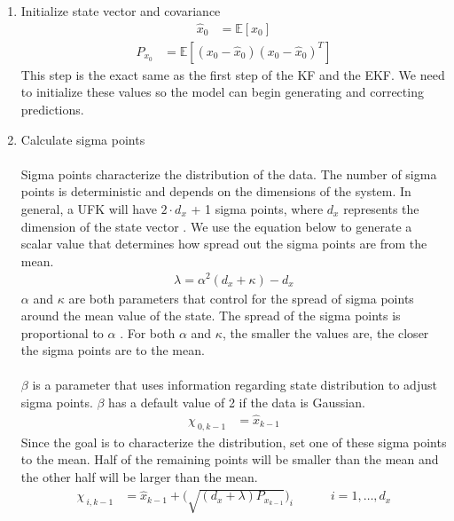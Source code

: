 \begin{enumerate}
    \item Initialize state vector and covariance
    \begin{align*}
        \hat{x}_{0} &= \mathbb{E}[x_{0}] 
       \end{align*}
        \begin{align*}
        P_{x_{0}} &= \mathbb{E}[(x_{0}-\hat{x}_{0})(x_{0}-\hat{x}_{0})^{T}] 
    \end{align*}
    This step is the exact same as the first step of the KF and the EKF. We need to initialize these values so the model can begin generating and correcting predictions.
    
        \item Calculate sigma points \\ \\
        Sigma points characterize the distribution of the data. The number of sigma points is deterministic and depends on the dimensions of the system. In general, a UFK will have  $2 \cdot d_x$ + 1 sigma points, where $d_x$ represents the dimension of the state vector \cite{inbook, inproceedings, Wan01theunscented}.  We use the equation below to generate a scalar value that determines how spread out the sigma points are from the mean. 
         \begin{align*}
        \lambda = \alpha^{2}(d_{x}+\kappa)-d_{x} 
         \end{align*}
         $\alpha$ and $\kappa$ are both parameters that control for the spread of sigma points around the mean value of the state. The spread of the sigma points is proportional to $\alpha$ . For both $\alpha$ and $\kappa $,  the smaller the values are, the closer the sigma points are to the mean.\\ \\
       $\beta$ is a parameter that uses information regarding state distribution to adjust sigma points. $\beta$ has a default value of 2 if the data is Gaussian. 
    \begin{align*}
        \chi_{\ 0,k-1} &= \hat{x}_{k-1} 
     \end{align*}
             Since the goal is to characterize the distribution, set one of these sigma points to the mean. Half of the remaining points will be smaller than the mean and the other half will be larger than the mean.
     \begin{align*}
        \chi_{\ i,k-1} &= \hat{x}_{k-1} + \bigg(\sqrt{(d_{x}+\lambda )P_{x_{k-1}}}\bigg)_{i} \quad \quad \quad i=1,\dots,d_{x} 

\end{align*}
\end{enumerate}
